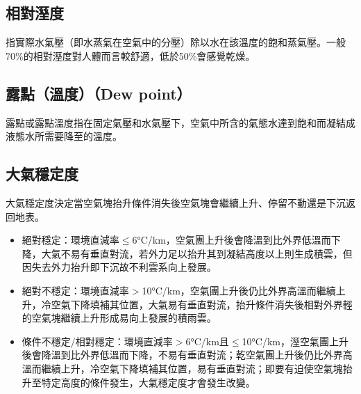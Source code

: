 \documentclass[a4paper,12pt]{report}
\begin{document}
\subsection{相對溼度}
指實際水氣壓（即水蒸氣在空氣中的分壓）除以水在該溫度的飽和蒸氣壓。一般70\%的相對溼度對人體而言較舒適，低於50\%會感覺乾燥。
\subsection{露點（溫度）（Dew point）}
露點或露點溫度指在固定氣壓和水氣壓下，空氣中所含的氣態水達到飽和而凝結成液態水所需要降至的溫度。
\subsection{大氣穩定度}
大氣穩定度決定當空氣塊抬升條件消失後空氣塊會繼續上升、停留不動還是下沉返回地表。
\begin{itemize}
  \item 絕對穩定：環境直減率$\leq$6°C/km，空氣團上升後會降溫到比外界低溫而下降，大氣不易有垂直對流，若外力足以抬升其到凝結高度以上則生成積雲，但因失去外力抬升即下沉故不利雲系向上發展。
  \item 絕對不穩定：環境直減率$>$10°C/km，空氣團上升後仍比外界高溫而繼續上升，冷空氣下降填補其位置，大氣易有垂直對流，抬升條件消失後相對外界輕的空氣塊繼續上升形成易向上發展的積雨雲。
  \item 條件不穩定/相對穩定：環境直減率$>$6°C/km且$\leq$10°C/km，溼空氣團上升後會降溫到比外界低溫而下降，不易有垂直對流；乾空氣團上升後仍比外界高溫而繼續上升，冷空氣下降填補其位置，易有垂直對流；即要有迫使空氣塊抬升至特定高度的條件發生，大氣穩定度才會發生改變。
\end{itemize}
\end{document}

